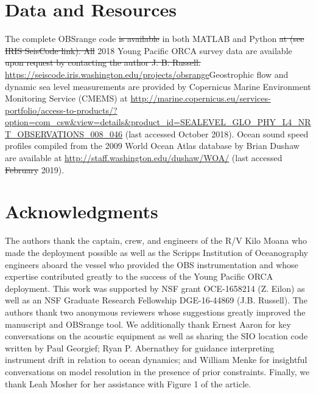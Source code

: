 \documentclass[10pt,titlepage]{article}
\providecommand{\DIFaddtex}[1]{{\protect\color{blue}\uwave{#1}}} %
\providecommand{\DIFdeltex}[1]{{\protect\color{red}\sout{#1}}}                      %
\providecommand{\DIFaddbegin}{} %
\providecommand{\DIFaddend}{} %
\providecommand{\DIFdelbegin}{} %
\providecommand{\DIFdelend}{} %
\providecommand{\DIFadd}[1]{\texorpdfstring{\DIFaddtex{#1}}{#1}} %
\providecommand{\DIFdel}[1]{\texorpdfstring{\DIFdeltex{#1}}{}} %
\begin{document}
\section{Data and Resources }
The complete OBSrange code \DIFdelbegin \DIFdel{is available }\DIFdelend in both MATLAB and Python \DIFdelbegin \DIFdel{at (see IRIS SeisCode link). All }\DIFdelend \DIFaddbegin \DIFadd{as well as all }\DIFaddend 2018 Young Pacific ORCA survey data are available \DIFdelbegin \DIFdel{upon request by contacting the author J. B. Russell. }\DIFdelend \DIFaddbegin \DIFadd{for download at }\href{https://seiscode.iris.washington.edu/projects/obsrange}{https://seiscode.iris.washington.edu/projects/obsrange}\DIFadd{. }\DIFaddend Geostrophic flow and dynamic sea level measurements are provided by Copernicus
Marine Environment Monitoring Service (CMEMS) at \href{http://marine.copernicus.eu/services-portfolio/access-to-products/?option=com_csw\&view=details\&product_id=SEALEVEL_GLO_PHY_L4_NRT_OBSERVATIONS_008_046}{http://marine.copernicus.eu/services-portfolio/access-to-products/?option=com\_csw\&view=details\&product\_id=SEALEVEL\_GLO\_PHY\_L4\_NRT\_OBSERVATIONS\_008\_046} (last accessed October 2018). Ocean sound speed profiles compiled from the 2009 World Ocean Atlas database by Brian Dushaw are available at \href{http://staff.washington.edu/dushaw/WOA/}{http://staff.washington.edu/dushaw/WOA/} (last accessed \DIFdelbegin \DIFdel{February }\DIFdelend \DIFaddbegin \DIFadd{March }\DIFaddend 2019).

\section{Acknowledgments }
The authors thank the captain, crew, and engineers of the R/V Kilo Moana who made the deployment possible as well as the Scripps Institution of Oceanography engineers aboard the vessel who provided the OBS instrumentation and whose expertise contributed greatly to the success of the Young Pacific ORCA deployment. This work was supported by NSF grant OCE-1658214 (Z. Eilon) as well as an NSF Graduate Research Fellowship DGE-16-44869 (J.B. Russell). The authors thank two anonymous reviewers whose suggestions greatly improved the manuscript and OBSrange tool. We additionally thank Ernest Aaron for key conversations on the acoustic equipment as well as sharing the SIO location code written by Paul Georgief; Ryan P. Abernathey for guidance interpreting instrument drift in relation to ocean dynamics; and William Menke for insightful conversations on model resolution in the presence of prior constraints. Finally, we thank Leah Mosher for her assistance with Figure 1 of the article.
\end{document}
